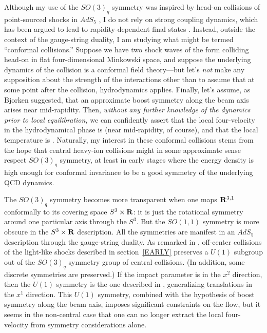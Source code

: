 \documentclass[12pt]{article}
\begin{document}
Although my use of the $SO(3)_q$ symmetry was inspired by head-on collisions of point-sourced shocks in $AdS_5$ \cite{Gubser:2008pc}, I do not rely on strong coupling dynamics, which has been argued to lead to rapidity-dependent final states \cite{Albacete:2008vs,Albacete:2009ji}.  Instead, outside the context of the gauge-string duality, I am studying what might be termed ``conformal collisions.''  Suppose we have two shock waves of the form  colliding head-on in flat four-dimensional Minkowski space, and suppose the underlying dynamics of the collision is a conformal field theory---but let's {\it not} make any supposition about the strength of the interactions other than to assume that at some point after the collision, hydrodynamics applies.  Finally, let's assume, as Bjorken suggested, that an approximate boost symmetry along the beam axis arises near mid-rapidity.  Then, {\it without any further knowledge of the dynamics prior to local equilibration,} we can confidently assert that the local four-velocity in the hydrodynamical phase is  (near mid-rapidity, of course), and that the local temperature is .  Naturally, my interest in these conformal collisions stems from the hope that central heavy-ion collisions might in some approximate sense respect $SO(3)_q$ symmetry, at least in early stages where the energy density is high enough for conformal invariance to be a good symmetry of the underlying QCD dynamics.

The $SO(3)_q$ symmetry becomes more transparent when one maps ${\bf R}^{3,1}$ conformally to its covering space $S^3 \times {\bf R}$: it is just the rotational symmetry around one particular axis through the $S^3$.  But the $SO(1,1)$ symmetry is more obscure in the $S^3 \times {\bf R}$ description.  All the symmetries are manifest in an $AdS_5$ description through the gauge-string duality.  As remarked in \cite{Gubser:2008pc,Gubser:2009sx}, off-center collisions of the light-like shocks described in section~\ref{EARLY} preserves a $U(1)$ subgroup out of the $SO(3)_q$ symmetry group of central collisions.  (In addition, some discrete symmetries are preserved.)  If the impact parameter is in the $x^2$ direction, then the $U(1)$ symmetry is the one described in , generalizing translations in the $x^1$ direction.  This $U(1)$ symmetry, combined with the hypothesis of boost symmetry along the beam axis, imposes significant constraints on the flow, but it seems in the non-central case that one can no longer extract the local four-velocity from symmetry considerations alone.
\end{document}

